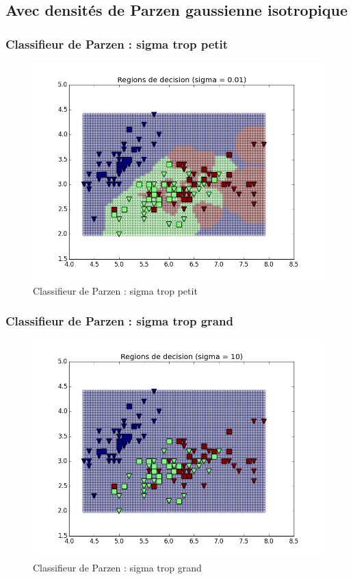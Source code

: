 \documentclass[a4paper,10pt]{article}
\begin{document}
\subsection{Avec densités de Parzen gaussienne isotropique}

\subsubsection{Classifieur de Parzen : sigma trop petit}
\begin{figure}[H]
	\includegraphics[width=12cm]{images/bayes_parzen_petit.png} 
	\centering
	\caption{Classifieur de Parzen : sigma trop petit}
	\label{fig:comp}
\end{figure}

\subsubsection{Classifieur de Parzen : sigma trop grand}
\begin{figure}[H]
	\includegraphics[width=12cm]{images/bayes_parzen_grand.png} 
	\centering
	\caption{Classifieur de Parzen : sigma trop grand}
	\label{fig:comp}
\end{figure}
\end{document}
